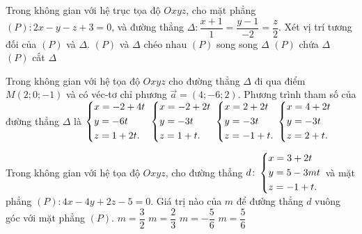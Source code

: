 \begin{ex}%
	Trong không gian với hệ trục tọa độ $Oxyz$, cho mặt phẳng $(P)\colon2x-y-z+3=0$, và đường thẳng $\Delta\colon\dfrac{x+1}{1}=\dfrac{y-1}{-2}=\dfrac{z}{2}$. Xét vị trí tương đối của $(P)$ và $\Delta$. 
	\choice
	{$(P)$ và $\Delta$ chéo nhau}
	{$(P)$ song song $\Delta$}
	{$(P)$ chứa $\Delta$}
	{\True $(P)$ cắt $\Delta$}
\end{ex}
\begin{ex}%
	Trong không gian với hệ tọa độ $Oxyz$ cho đường thẳng $\Delta$ đi qua điểm $M(2;0;-1)$ và có véc-tơ chỉ phương $\overrightarrow{a}=(4;-6;2)$. Phương trình tham số của đường thẳng $\Delta$ là
	\choice
	{$\left\{\begin{aligned}&x=-2+4t\\&y=-6t\\&z=1+2t.\end{aligned}\right.$}
	{$\left\{\begin{aligned}&x=-2+2t\\&y=-3t\\&z=1+t.\end{aligned}\right.$}
	{\True $\left\{\begin{aligned}&x=2+2t\\&y=-3t\\&z=-1+t.\end{aligned}\right.$}
	{$\left\{\begin{aligned}&x=4+2t\\&y=-3t\\&z=2+t.\end{aligned}\right.$}
\end{ex}
\begin{ex}%
	Trong không gian với hệ tọa độ $Oxyz$, cho đường thẳng $d\colon\left\{\begin{aligned}&x=3+2t\\&y=5-3mt\\&z=-1+t.\end{aligned}\right.$ và mặt phẳng $(P)\colon4x-4y+2z-5=0$. Giá trị nào của $m$ để đường thẳng $d$ vuông góc với mặt phẳng $(P)$. 
	\choice
	{$m=\dfrac{3}{2}$}
	{\True $m=\dfrac{2}{3}$}
	{$m=-\dfrac{5}{6}$}
	{$m=\dfrac{5}{6}$}
\end{ex}
